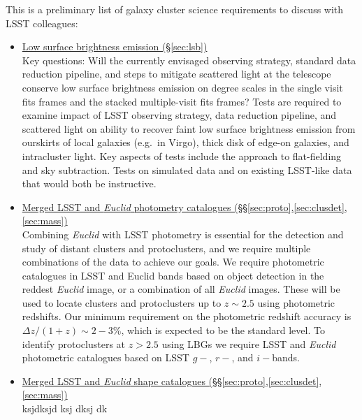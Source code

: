 \documentclass[a4paper,11pt]{article}
\begin{document}
\noindent This is a preliminary list of galaxy cluster science
requirements to discuss with LSST colleagues:
\begin{itemize}
\item\underline{Low surface brightness emission
  (\S\ref{sec:lsb})}\smallskip\\Key questions: Will the currently
  envisaged observing strategy, standard data reduction pipeline, and
  steps to mitigate scattered light at the telescope conserve low
  surface brightness emission on degree scales in the single visit
  fits frames and the stacked multiple-visit fits frames?  Tests are
  required to examine impact of LSST observing strategy, data
  reduction pipeline, and scattered light on ability to recover faint
  low surface brightness emission from ourskirts of local galaxies
  (e.g.\ in Virgo), thick disk of edge-on galaxies, and intracluster
  light.  Key aspects of tests include the approach to flat-fielding
  and sky subtraction.  Tests on simulated data and on existing
  LSST-like data that would both be instructive.

\item\underline{Merged LSST and \emph{Euclid} photometry 
  catalogues
  (\S\S\ref{sec:proto},\ref{sec:clusdet},\ref{sec:mass})}\smallskip\\

Combining \emph{Euclid} with LSST photometry is essential for the detection and study of distant clusters and protoclusters, and we require multiple combinations of the data to achieve our goals.  We require photometric catalogues in LSST and Euclid bands based on object detection in the reddest \emph{Euclid} image, or a combination of all \emph{Euclid} images. These will be used to locate clusters and protoclusters up to $z\sim2.5$ using photometric redshifts. Our minimum requirement on the photometric redshift accuracy is $\Delta z/(1+z)\sim2-3$\%, which is expected to be the standard level. To identify protoclusters at $z>2.5$ using LBGs we require LSST and \emph{Euclid} photometric catalogues based on LSST $g-$, $r-$, and $i-$bands.

\item\underline{Merged LSST and \emph{Euclid} shape
  catalogues
  (\S\S\ref{sec:proto},\ref{sec:clusdet},\ref{sec:mass})}\smallskip\\ksjdksjd ksj dksj dk


\end{itemize}
\end{document}
